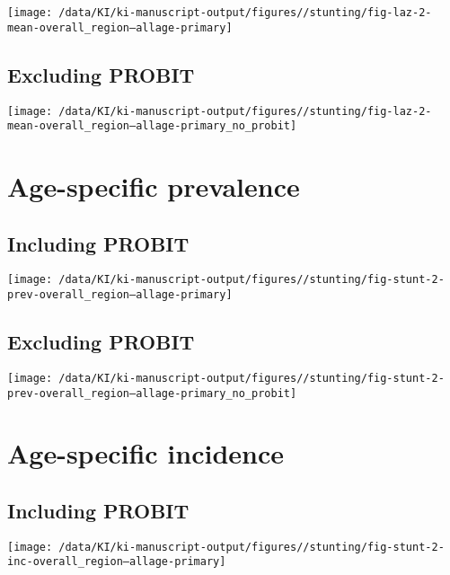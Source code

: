 \documentclass[
  9pt,
]{book}
\begin{document}
\texttt{[image: /data/KI/ki-manuscript-output/figures//stunting/fig-laz-2-mean-overall\_region--allage-primary]}

\hypertarget{excluding-probit}{%
\subsection{Excluding PROBIT}\label{excluding-probit}}

\texttt{[image: /data/KI/ki-manuscript-output/figures//stunting/fig-laz-2-mean-overall\_region--allage-primary\_no\_probit]}

\hypertarget{age-specific-prevalence-1}{%
\section{Age-specific prevalence}\label{age-specific-prevalence-1}}

\hypertarget{including-probit-1}{%
\subsection{Including PROBIT}\label{including-probit-1}}

\texttt{[image: /data/KI/ki-manuscript-output/figures//stunting/fig-stunt-2-prev-overall\_region--allage-primary]}

\hypertarget{excluding-probit-1}{%
\subsection{Excluding PROBIT}\label{excluding-probit-1}}

\texttt{[image: /data/KI/ki-manuscript-output/figures//stunting/fig-stunt-2-prev-overall\_region--allage-primary\_no\_probit]}

\hypertarget{age-specific-incidence-1}{%
\section{Age-specific incidence}\label{age-specific-incidence-1}}

\hypertarget{including-probit-2}{%
\subsection{Including PROBIT}\label{including-probit-2}}

\texttt{[image: /data/KI/ki-manuscript-output/figures//stunting/fig-stunt-2-inc-overall\_region--allage-primary]}
\end{document}
